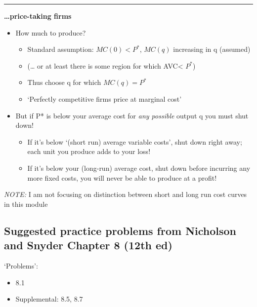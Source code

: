 \documentclass[]{article}
\providecommand{\tightlist}{%
  \setlength{\itemsep}{0pt}\setlength{\parskip}{0pt}}
\begin{document}
\begin{center}\rule{0.5\linewidth}{\linethickness}\end{center}

\textbf{\ldots price-taking firms}

\begin{itemize}
\tightlist
\item
  How much to produce?

  \begin{itemize}
  \tightlist
  \item
    Standard assumption: \(MC(0)<P^*\), \(MC(q)\) increasing in q
    (assumed)
  \item
    (\ldots{} or at least there is some region for which AVC\textless{}
    \(P^*\))
  \item
    Thus choose q for which \(MC(q) = P^*\)
  \item
    `Perfectly competitive firms price at marginal cost'
  \end{itemize}
\item
  But if P* is below your average cost for \emph{any possible} output q
  you must shut down!

  \begin{itemize}
  \tightlist
  \item
    If it's below `(short run) average variable costs', shut down right
    away; each unit you produce adds to your loss!
  \item
    If it's below your (long-run) average cost, shut down before
    incurring any more fixed costs, you will never be able to produce at
    a profit!
  \end{itemize}
\end{itemize}

\emph{NOTE:} I am not focusing on distinction between short and long run
cost curves in this module

\hypertarget{suggested-practice-problems-from-nicholson-and-snyder-chapter-8-12th-ed}{%
\subsection{Suggested practice problems from Nicholson and Snyder
Chapter 8 (12th
ed)}\label{suggested-practice-problems-from-nicholson-and-snyder-chapter-8-12th-ed}}

`Problems':

\begin{itemize}
\tightlist
\item
  8.1
\item
  Supplemental: 8.5, 8.7
\end{itemize}
\end{document}
